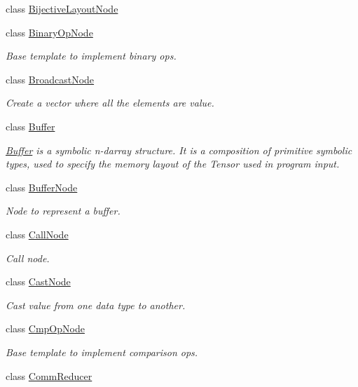 \begin{DoxyCompactItemize}
class \hyperlink{classtvm_1_1tir_1_1BijectiveLayoutNode}{Bijective\+Layout\+Node}
\item 
class \hyperlink{classtvm_1_1tir_1_1BinaryOpNode}{Binary\+Op\+Node}
\begin{DoxyCompactList}\small\item\em Base template to implement binary ops. \end{DoxyCompactList}\item 
class \hyperlink{classtvm_1_1tir_1_1BroadcastNode}{Broadcast\+Node}
\begin{DoxyCompactList}\small\item\em Create a vector where all the elements are value. \end{DoxyCompactList}\item 
class \hyperlink{classtvm_1_1tir_1_1Buffer}{Buffer}
\begin{DoxyCompactList}\small\item\em \hyperlink{classtvm_1_1tir_1_1Buffer}{Buffer} is a symbolic n-\/darray structure. It is a composition of primitive symbolic types, used to specify the memory layout of the Tensor used in program input. \end{DoxyCompactList}\item 
class \hyperlink{classtvm_1_1tir_1_1BufferNode}{Buffer\+Node}
\begin{DoxyCompactList}\small\item\em Node to represent a buffer. \end{DoxyCompactList}\item 
class \hyperlink{classtvm_1_1tir_1_1CallNode}{Call\+Node}
\begin{DoxyCompactList}\small\item\em Call node. \end{DoxyCompactList}\item 
class \hyperlink{classtvm_1_1tir_1_1CastNode}{Cast\+Node}
\begin{DoxyCompactList}\small\item\em Cast value from one data type to another. \end{DoxyCompactList}\item 
class \hyperlink{classtvm_1_1tir_1_1CmpOpNode}{Cmp\+Op\+Node}
\begin{DoxyCompactList}\small\item\em Base template to implement comparison ops. \end{DoxyCompactList}\item 
class \hyperlink{classtvm_1_1tir_1_1CommReducer}{Comm\+Reducer}

\end{DoxyCompactItemize}
